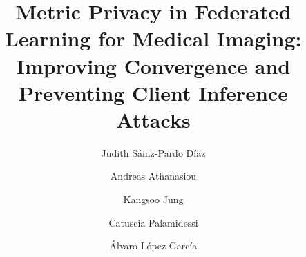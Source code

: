 \documentclass[5p,times]{elsarticle}
\begin{document}
\begin{frontmatter}


\title{Metric Privacy in Federated Learning for Medical Imaging: Improving Convergence and Preventing Client Inference Attacks}


\author[IFCA]{Judith Sáinz-Pardo Díaz}
\author[INRIA]{Andreas Athanasiou}
\author[INRIA]{Kangsoo Jung}
\author[INRIA]{Catuscia Palamidessi}
\author[IFCA]{Álvaro López García}

\address[IFCA]{Instituto de Física de Cantabria (IFCA), CSIC-UC \\ Avda. los Castros s/n. 39005 - Santander (Spain)}
\address[INRIA]{INRIA Saclay, Ecole Polytechnique (LIX) \\ 1 Rue Honore d’Estienne d’Orves 91120 - Palaiseau, Ile-de-France (France)}


\end{frontmatter}
\end{document}
